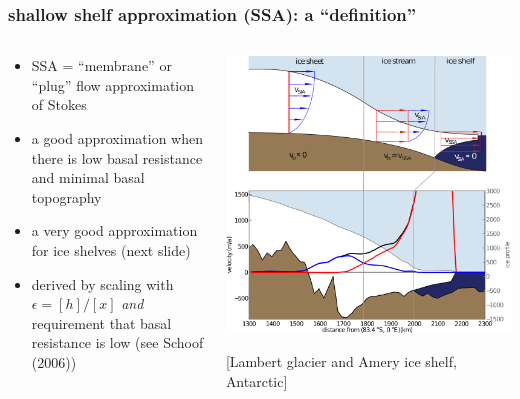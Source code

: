 \documentclass{beamer}
\newcommand{\eps}{\epsilon}
\begin{document}
\begin{frame}
  \frametitle{shallow shelf approximation (SSA): a ``definition''}

\begin{columns}
\begin{column}{0.52\textwidth}
\begin{itemize}
\small
\item SSA = ``membrane'' or ``plug'' flow approximation of Stokes
\item a good approximation when there is low basal resistance and minimal basal topography
\item a very good approximation for ice shelves (next slide)
\item derived by scaling with $\eps = [h]/[x]$ \emph{and} requirement that basal resistance is low (see Schoof (2006))
\end{itemize}
\end{column}

\begin{column}{0.48\textwidth}
\includegraphics[width=1.1\textwidth]{siassacartoon-lambert}

\begin{center}
\vspace{-0.18in}
\tiny [Lambert glacier and Amery ice shelf, Antarctic]
\end{center}
\end{column}
\end{columns}
\end{frame}
\end{document}
